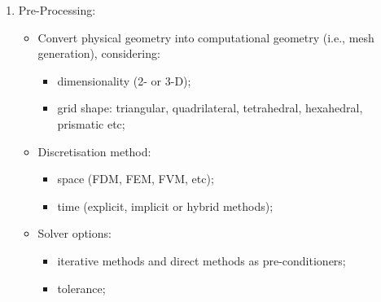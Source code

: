 \documentclass[calculator,datasheet,solutions]{exam}
\newcommand{\frc}{\displaystyle\frac}
\begin{document}
\begin{question}
{\begin{enumerate}
\begin{itemize}
\begin{itemize}
\item empirical and semi-empirical expressions for interphase heat transfer $\left(\gamma\right)$ wall-phase heat transfer $\left(\Omega\right)$ coefficients (as function of $Nu$, $Re$ and $Pr$ dimensionless numbers);~
\item differential equations representing reaction rates $\left(\mathcal{R}\right)$;~
\end{itemize}
\item  Initial conditions: T$_{i}\left(\underline{x},t=0\right)$, P$\left(\underline{x},t=0\right)$, $\underline{u}_{i}\left(\underline{x},t=0\right)$, $\alpha_{i}\left(\underline{x},t=0\right)$, $\omega_{i,j}\left(\underline{x},t=0\right)$. ~ 
\item Boundary conditions:
\begin{itemize}
\item Dirichlet boundary conditions for velocity $\left(\underline{u}\right)$, temperature $\left(T_{i}\right)$, volume $\left(\alpha_{i}\right)$ and mass $\left(\omega_{i,j}\right)$ fractions in all fluid entries;~
\item No flow across the walls, baffles and agitators (Robin boundary condition):~
\begin{displaymath}
\left(\frc{\partial \underline{u}_{i}}{\partial \underline{n}_{j}}\right)_{w,b,a}=0
\end{displaymath}
\end{itemize}
\end{itemize}
%
\item Pre-Processing:
\begin{itemize}
\item Convert physical geometry into computational geometry (i.e., mesh generation), considering:
\begin{itemize}
\item dimensionality (2- or 3-D);~
\item grid shape: triangular, quadrilateral, tetrahedral, hexahedral, prismatic etc;~
\end{itemize} 
\item Discretisation method:
\begin{itemize}
\item space (FDM, FEM, FVM, etc);~
\item time (explicit, implicit or hybrid methods);~
\end{itemize}
\item Solver options:
\begin{itemize}
\item iterative methods and direct methods as pre-conditioners;~
\item tolerance;~
\end{itemize}
\end{itemize}
%
\end{enumerate}
} 

\end{question}


\vfill


\paperend
\end{document}
